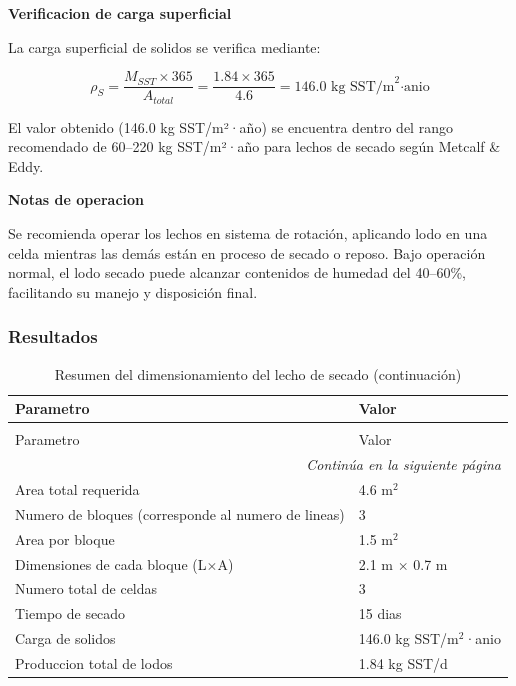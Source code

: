 \documentclass[12pt,a4paper]{article}
\begin{document}
\textbf{Verificacion de carga superficial}

La carga superficial de solidos se verifica mediante:

\begin{equation}
\rho_S = \frac{M_{SST} \times 365}{A_{total}} = \frac{1.84 \times 365}{4.6} = 146.0 \text{ kg SST/m}^2\text{·anio}
\end{equation}

El valor obtenido (146.0 kg SST/m²·año) se encuentra dentro del rango recomendado de 60--220 kg SST/m²·año para lechos de secado según Metcalf & Eddy.

\textbf{Notas de operacion}

Se recomienda operar los lechos en sistema de rotación, aplicando lodo en una celda mientras las demás están en proceso de secado o reposo. Bajo operación normal, el lodo secado puede alcanzar contenidos de humedad del 40--60\%, facilitando su manejo y disposición final.

\subsubsection{Resultados}

\begingroup
\small
\begin{longtable}{ll}
\caption{Resumen del dimensionamiento del lecho de secado}\\
\toprule
Parametro & Valor \\
\midrule
\endfirsthead
\caption[]{Resumen del dimensionamiento del lecho de secado (continuación)}\\
\toprule
Parametro & Valor \\
\midrule
\endhead
\midrule
\multicolumn{2}{r}{\textit{Continúa en la siguiente página}} \\
\endfoot
\bottomrule
\endlastfoot
Area total requerida & 4.6 m$^2$ \\
Numero de bloques (corresponde al numero de lineas) & 3 \\
Area por bloque & 1.5 m$^2$ \\
Dimensiones de cada bloque (L$\times$A) & 2.1 m $\times$ 0.7 m \\
Numero total de celdas & 3 \\
Tiempo de secado & 15 dias \\
Carga de solidos & 146.0 kg SST/m$^2$·anio \\
Produccion total de lodos & 1.84 kg SST/d \\
\end{longtable}
\endgroup
\end{document}
